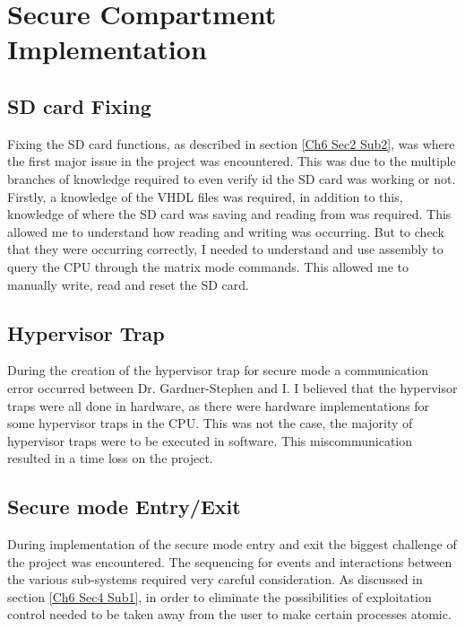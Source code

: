 
\section{Secure Compartment Implementation}

\label{Ch7 Sec2}

\subsection{SD card Fixing}

\label{Ch7 Sec2 Sub1}

Fixing the SD card functions, as described in section \ref{Ch6 Sec2 Sub2}, was where the first major issue in the project was encountered. This was due to the multiple branches of knowledge required to even verify id the SD card was working or not. Firstly, a knowledge of the VHDL files was required, in addition to this, knowledge of where the SD card was saving and reading from was required. This allowed me to understand how reading and writing was occurring. But to check that they were occurring correctly, I needed to understand and use assembly to query the CPU through the matrix mode commands. This allowed me to manually write, read and reset the SD card.

\subsection{Hypervisor Trap}

\label{Ch7 Sec2 Sub2}

During the creation of the hypervisor trap for secure mode a communication error occurred between Dr. Gardner-Stephen and I. I believed that the hypervisor traps were all done in hardware, as there were hardware implementations for some hypervisor traps in the CPU. This was not the case, the majority of hypervisor traps were to be executed in software. This miscommunication resulted in a time loss on the project.

\subsection{Secure mode Entry/Exit}

\label{Ch7 Sec2 Sub3}

During implementation of the secure mode entry and exit the biggest challenge of the project was encountered. The sequencing for events and interactions between the various sub-systems required very careful consideration. As discussed in section \ref{Ch6 Sec4 Sub1}, in order to eliminate the possibilities of exploitation control needed to be taken away from the user to make certain processes atomic.

